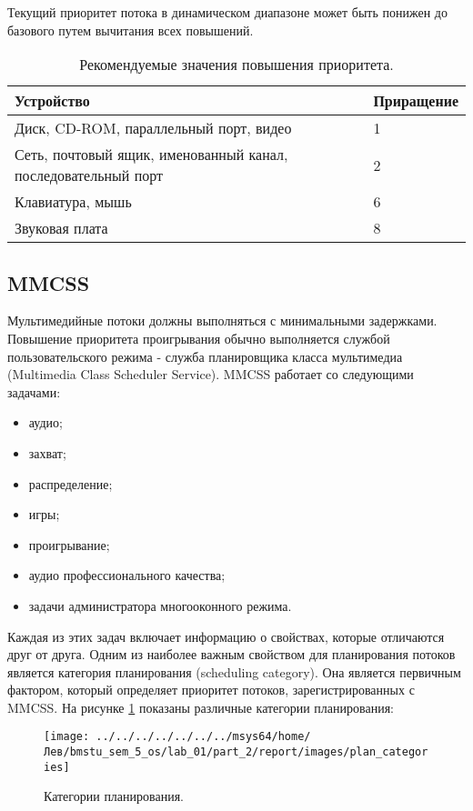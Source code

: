 Текущий приоритет потока в динамическом диапазоне может быть понижен до базового путем вычитания всех повышений.

\begin{table}[ht!]
	\captionsetup{singlelinecheck = false, justification=raggedright}
	\caption{Рекомендуемые значения повышения приоритета.}
	\begin{center}
		\begin{tabular}{|p{100mm}|l|}
			\hline
			\textbf{Устройство} & \textbf{Приращение} \\
			\hline
			Диск, CD-ROM, параллельный порт, видео & 1 \\
			\hline
			Сеть, почтовый ящик, именованный канал, последовательный порт & 2 \\
			\hline
			Клавиатура, мышь & 6 \\
			\hline
			Звуковая плата & 8 \\
			\hline
		\end{tabular}
	\end{center}
	\label{tab:io}
\end{table}

\subsection{MMCSS}
Мультимедийные потоки должны выполняться с минимальными задержками. Повышение приоритета проигрывания обычно выполняется службой пользовательского режима - служба планировщика класса мультимедиа (Multimedia Class Scheduler Service). MMCSS работает со следующими задачами:
\begin{itemize}
	\item аудио;
	\item захват;
	\item распределение;
	\item игры;
	\item проигрывание;
	\item аудио профессионального качества;
	\item задачи администратора многооконного режима.	
\end{itemize}

Каждая из этих задач включает информацию о свойствах, которые отличаются друг от друга. Одним из наиболее важным свойством для планирования потоков является категория планирования (scheduling category). Она является первичным фактором, который определяет приоритет потоков, зарегистрированных с MMCSS. На рисунке \ref{png:category_plans} показаны различные категории планирования:
\begin{figure}[H]
	\centering
	{
		\texttt{[image: ../../../../../../../msys64/home/Лев/bmstu\_sem\_5\_os/lab\_01/part\_2/report/images/plan\_categories]}
		\caption{Категории планирования.}
		\label{png:category_plans}
	}
\end{figure}


